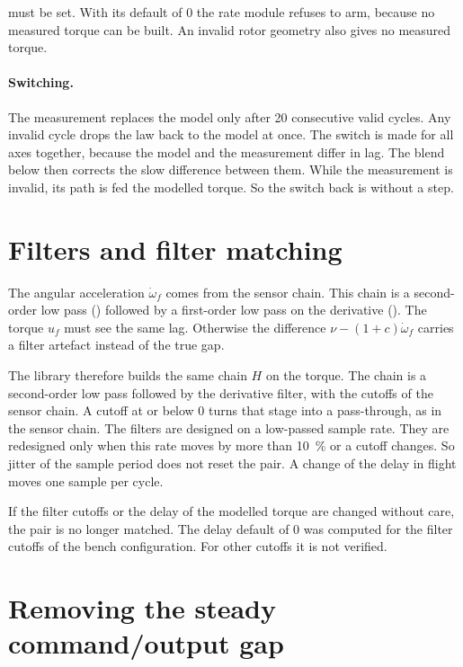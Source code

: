  must be set.
With its default of 0 the rate module refuses to arm, because no measured torque can be built.
An invalid rotor geometry also gives no measured torque.

\paragraph{Switching.}
The measurement replaces the model only after 20 consecutive valid cycles.
Any invalid cycle drops the law back to the model at once.
The switch is made for all axes together, because the model and the measurement differ in lag.
The blend below then corrects the slow difference between them.
While the measurement is invalid, its path is fed the modelled torque.
So the switch back is without a step.

\section{Filters and filter matching}\label{sec:inner_filters}

The angular acceleration $\dot\omega_f$ comes from the sensor chain.
This chain is a second-order low pass () followed by a first-order low pass on the derivative ().
The torque $u_f$ must see the same lag.
Otherwise the difference $\nu-(1+c)\dot\omega_f$ carries a filter artefact instead of the true gap.

The library therefore builds the same chain $H$ on the torque.
The chain is a second-order low pass followed by the derivative filter, with the cutoffs of the sensor chain.
A cutoff at or below 0 turns that stage into a pass-through, as in the sensor chain.
The filters are designed on a low-passed sample rate.
They are redesigned only when this rate moves by more than 10~\% or a cutoff changes.
So jitter of the sample period does not reset the pair.
A change of the delay in flight moves one sample per cycle.

\begin{indinote}
If the filter cutoffs or the delay of the modelled torque are changed without care, the pair is no longer matched.
The delay default of 0 was computed for the filter cutoffs of the bench configuration.
For other cutoffs it is not verified.
\end{indinote}

\section{Removing the steady command/output gap}\label{sec:inner_gap}

